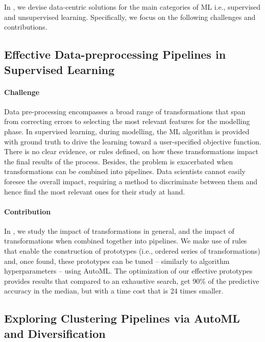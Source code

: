 In , we devise data-centric solutions for the main categories of ML i.e., supervised and unsupervised learning.
Specifically, we focus on the following challenges and contributions.

\subsection*{Effective Data-preprocessing Pipelines in Supervised Learning}

\paragraph{Challenge} Data pre-processing
encompasses a broad range of transformations that span from correcting errors to selecting the most relevant features for the modelling phase.
In supervised learning, during modelling, the ML algorithm is provided with ground truth to drive the learning toward a user-specified objective function.
There is no clear evidence, or rules defined, on how these transformations impact the final results of the process.
Besides, the problem is exacerbated when transformations can be combined into pipelines.
Data scientists cannot easily foresee the overall impact, requiring a method to discriminate between them and hence find the most relevant ones for their study at hand.

\paragraph{Contribution} In , we study the impact of transformations in general, and the impact of transformations when combined together into pipelines.
We make use of rules that enable the construction of prototypes (i.e., ordered series of transformations) and, once found, these prototypes can be tuned -- similarly to algorithm hyperparameters -- using AutoML.
The optimization of our effective prototypes provides results that compared to an exhaustive search, get 90\% of the predictive accuracy in the median, but with a time cost that is 24 times smaller.

\subsection*{Exploring Clustering Pipelines via AutoML and Diversification}


